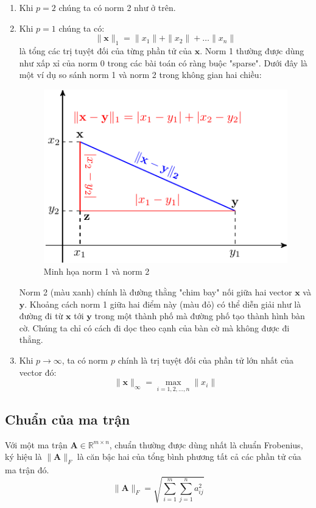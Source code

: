 \documentclass[12pt]{article}
\begin{document}
\begin{enumerate}
 	\item Khi $p = 2$ chúng ta có norm 2 như ở trên.
 
 	
 	\item Khi $p = 1$ chúng ta có:
		\begin{equation} 
		\label{eqn:norm1}
		\|\mathbf{x}\|_1 = \|x_1\| + \|x_2\| + \dots \|x_n\|
		\end{equation} 
		là tổng các trị tuyệt đối của từng phần tử của $\mathbf{x}$. Norm 1 thường được dùng như xấp xỉ của norm 0 trong các bài toán có ràng buộc "sparse". Dưới đây là một ví dụ so sánh norm 1 và norm 2 trong không gian hai chiều: 

		\begin{figure}
			\centering	
			\includegraphics[width = .5\textwidth]{norm12.pdf}
			\caption{Minh họa norm 1 và norm 2}
			\label{fig:norm12}
		\end{figure}
		Norm 2 (màu xanh) chính là đường thằng "chim bay" nối giữa hai vector $\mathbf{x} $ và $\mathbf{y}$. Khoảng cách norm 1 giữa hai điểm này (màu đỏ) có thể diễn giải như là đường đi từ $\mathbf{x} $ tới $\mathbf{y}$ trong một thành phố mà đường phố tạo thành hình bàn cờ. Chúng ta chỉ có cách đi dọc theo cạnh của bàn cờ mà không được đi thẳng. 
 	
 	\item Khi $p \rightarrow \infty $, ta có norm $p$ chính là trị tuyệt đối của phần tử lớn nhất của vector đó:
		\begin{equation} 
		\|\mathbf{x}\|_{\infty} = \max_{i = 1, 2, \dots, n} \|x_i\|
		\end{equation} 
 
\end{enumerate} 
 
\subsection{Chuẩn của ma trận}
Với một ma trận $\mathbf{A} \in \mathbb{R}^{m\times n}$, chuẩn thường được dùng nhất là chuẩn Frobenius, ký hiệu là $\|\mathbf{A}\|_F$ là căn bậc hai của tổng bình phương tất cả các phần tử của ma trận đó.  
\begin{equation*} 
\|\mathbf{A}\|_F = \sqrt{\sum_{i = 1}^m \sum_{j = 1}^n a_{ij}^2} 
\end{equation*} 
 
\end{document}
